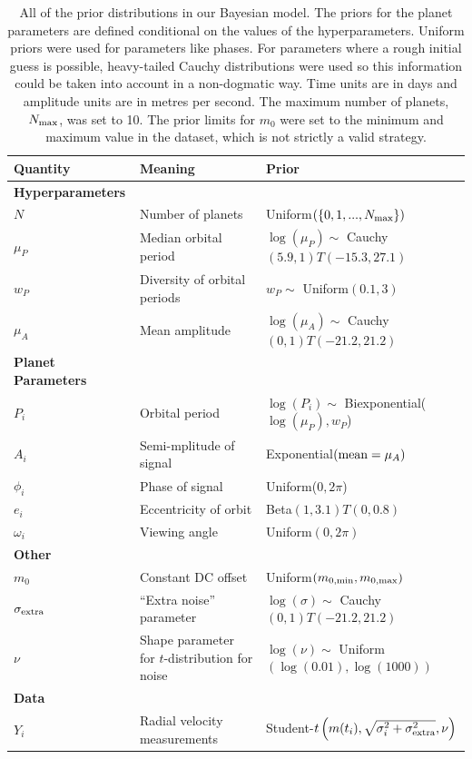\documentclass[useAMS,usenatbib]{mn2e}
\begin{document}
\begin{table}
\begin{tabular}{|l|l|l|}
\hline
Quantity	&	Meaning		& Prior\\
\hline
{\bf Hyperparameters}	&	\\
$N$		& Number of planets	& Uniform$(\{0, 1, ..., N_{\rm max}\})$\\
$\mu_P$		&	Median orbital period	& $\log(\mu_P) \sim$ Cauchy$(5.9, 1)T(-15.3, 27.1)$\\
$w_P$		&	Diversity of orbital periods & $w_P \sim$ Uniform$(0.1, 3)$\\
$\mu_A$		&	Mean amplitude	& $\log(\mu_A) \sim$ Cauchy$(0, 1)T(-21.2, 21.2)$\\
\hline
{\bf Planet Parameters}\\
$P_i$		&	Orbital period	&	$\log(P_i) \sim $ Biexponential($\log(\mu_P), w_P$)\\
$A_i$		&	Semi-mplitude of signal	& Exponential$(\textnormal{mean}=\mu_A)$\\
$\phi_i$	&	Phase of signal	&	Uniform($0, 2\pi$)\\
$e_i$		&	Eccentricity of orbit	&	Beta$(1, 3.1)T(0, 0.8)$\\
$\omega_i$	&	Viewing angle	&	Uniform$(0, 2\pi)$\\
\hline
{\bf Other}\\
$m_0$		&	Constant DC offset	&	Uniform$(m_{0, \rm min}, m_{0, \rm max})$\\
$\sigma_{\rm extra}$	& ``Extra noise'' parameter	& $\log(\sigma) \sim$ Cauchy$(0, 1)T(-21.2, 21.2)$\\
$\nu$		& Shape parameter for $t$-distribution for noise & $\log(\nu) \sim$ Uniform$(\log(0.01), \log(1000))$\\
\hline
{\bf Data}\\
$Y_i$		& Radial velocity measurements	&
		Student-$t\left(m(t_i), \sqrt{\sigma_i^2 + \sigma_{\rm extra}^2}, \nu\right)$
\end{tabular}
\caption{All of the prior distributions in our Bayesian model.
The priors for the planet parameters are defined conditional on the values
of the hyperparameters. Uniform priors were used for parameters like phases.
For parameters where a rough initial guess is possible, heavy-tailed Cauchy
distributions were used so this information could be taken into account
in a non-dogmatic way. Time units are in days and amplitude units are
in metres per second. The maximum number of planets, $N_{\rm max}$, was set
to 10. The prior limits for $m_0$ were set to the minimum and maximum value
in the dataset, which is not strictly a valid strategy.\label{tab:priors}}
\end{table}
\end{document}
